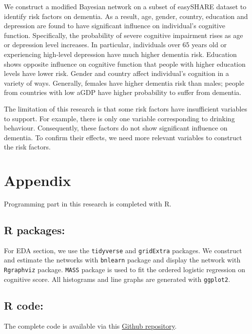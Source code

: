 \documentclass[11pt,twoside]{article}
\numberwithin{Theorem}{section}
\numberwithin{Definition}{section}
\numberwithin{Lemma}{section}
\numberwithin{Algorithm}{section}
\numberwithin{equation}{section}
\begin{document}
We construct a modified Bayesian network on a subset of easySHARE dataset to identify risk factors on dementia. As a result, age, gender, country, education and depression are found to have significant influence on individual's cognitive function. Specifically, the probability of severe cognitive impairment rises as age or depression level increases. In particular, individuals over 65 years old or experiencing high-level depression have much higher dementia risk. Education shows opposite influence on cognitive function that people with higher education levels have lower risk. Gender and country affect individual's cognition in a variety of ways. Generally, females have higher dementia risk than males; people from countries with low aGDP have higher probability to suffer from dementia.

The limitation of this research is that some risk factors have insufficient variables to support. For example, there is only one variable corresponding to drinking behaviour. Consequently, these factors do not show significant influence on dementia. To confirm their effects, we need more relevant variables to construct the risk factors. 

\clearpage



\clearpage

\appendix
\section*{Appendix}

Programming part in this research is completed with R. 

\subsection*{R packages:}

For EDA section, we use the \texttt{tidyverse} and \texttt{gridExtra} packages. We construct and estimate the networks with \texttt{bnlearn} package and display the network with \texttt{Rgraphviz} package. \texttt{MASS} package is used to fit the ordered logistic regression on cognitive score. All histograms and line graphs are generated with \texttt{ggplot2}.

\subsection*{R code: }
The complete code is available via this \href{https://github.com/Shi-Yile/Project-1-Dementia-Risk-Factors.git}{Github repository}.
\end{document}
